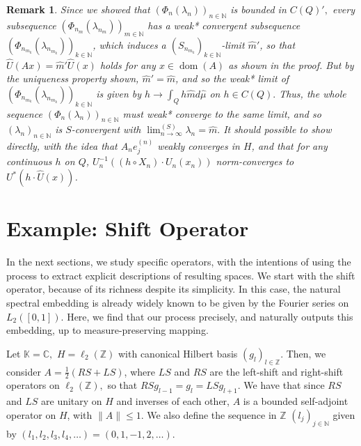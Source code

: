 \documentclass[10pt,a4paper]{amsart}
\newtheorem{remark}[thm]{Remark}
\def \Dom{\operatorname{dom}}
\def \HMU{\hat{\mu}}
\def \HU{\hat{U}}
\def \Hm{\hat{m}}
\begin{document}
\begin{remark}\label{remark_convergent_eigenvalue}
	Since we showed that $(\Phi_n(\lambda_n))_{n\in\mathbb{N}}$ is bounded in $C(Q)',$ every subsequence $(\Phi_{n_m}(\lambda_{n_m}))_{m\in\mathbb{N}}$ has a weak* convergent subsequence $(\Phi_{n_{m_k}}(\lambda_{n_{m_k}}))_{k\in\mathbb{N}}$, which induces a $(S_{n_{m_k}})_{k\in\mathbb{N}}$-limit $\Hm'$, so that $\HU(Ax)=\Hm'\HU(x)$ holds for any $x\in\Dom(A)$ as shown in the proof. But by the uniqueness property shown, $\Hm'=\Hm$, and so the weak* limit of $(\Phi_{n_{m_k}}(\lambda_{n_{m_k}}))_{k\in\mathbb{N}}$ is given by $h\rightarrow\int_{Q}h\Hm d\HMU$ on $h\in C(Q).$ Thus, the whole sequence $(\Phi_n(\lambda_n))_{n\in\mathbb{N}}$ must weak* converge to the same limit, and so $(\lambda_n)_{n\in\mathbb{N}}$ is $S$-convergent with $\lim_{n\rightarrow\infty}^{(S)} \lambda_n = \Hm.$ It should possible to show directly, with the idea that $A_n e_j^{(n)}$ weakly converges in $H$, and that for any continuous $h$ on $Q$, $U_n^{-1}((h\circ X_n)\cdot U_n (x_n))$ norm-converges to $U^*(h\cdot \HU(x))$. %
\end{remark}

\section{Example: Shift Operator}\label{section_shift}

In the next sections, we study specific operators, with the intentions of using the process to extract explicit descriptions of resulting spaces. We start with the shift operator, because of its richness despite its simplicity. In this case, the natural spectral embedding is already  widely known to be given by the Fourier series on $L_2([0,1])$. Here, we find that our process precisely, and naturally outputs this embedding, up to measure-preserving mapping.

Let $\mathbb{K}=\mathbb{C},$ $H=\ell_2(\mathbb{Z})$ with canonical Hilbert basis $(g_l)_{l\in\mathbb{Z}}$. Then, we consider $A=\frac{1}{2}(RS+LS)$, where $LS$ and $RS$ are the left-shift and right-shift operators on $\ell_2(\mathbb{Z}),$ so that $RSg_{l-1}=g_{l}=LSg_{l+1}$. We have that since $RS$ and $LS$  are unitary on $H$ and inverses of each other, $A$ is a bounded self-adjoint operator on $H$, with $\|A\|\leq 1$. We also define the sequence in $\mathbb{Z}$ $(l_j)_{j\in\mathbb{N}}$ given by $(l_1,l_2,l_3,l_4,\dots)=(0,1,-1,2,\dots).$
\end{document}
